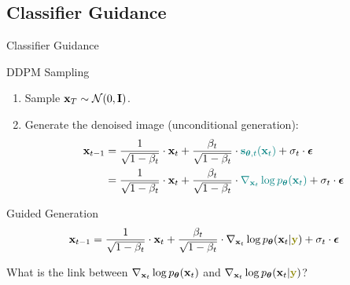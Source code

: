 \documentclass{beamer}
\renewcommand{\eqpause}{}
\renewcommand{\nextonslide}[1]{#1}
\begin{document}
\subsection{Classifier Guidance}
\begin{frame}{Classifier Guidance}
	\begin{block}{DDPM Sampling}
		\begin{enumerate}
			\item Sample $\mathbf{x}_T \sim \mathcal{N}(0, \mathbf{I})$.
			\item Generate the denoised image (unconditional generation):
			\vspace{-0.3cm}
			\begin{align*}
				\bx_{t - 1} &= \frac{1}{\sqrt{1 - \beta_t}} \cdot \bx_t + \frac{\beta_t}{\sqrt{1 - \beta_t}} \cdot {\color{teal}\bs_{\btheta, t} (\bx_t)} +  \sigma_t \cdot \bepsilon \\
				\nextonslide{
				& = \frac{1}{\sqrt{1 - \beta_t}} \cdot \bx_t + \frac{\beta_t}{\sqrt{1 - \beta_t}} \cdot {\color{teal} \nabla_{\bx_t} \log \pt(\bx_t)} +  \sigma_t \cdot \bepsilon
				}
			\end{align*}
			\vspace{-0.5cm}
		\end{enumerate}
	\end{block}
	\eqpause
	\begin{block}{Guided Generation}
		\vspace{-0.5cm}
		\[
			\bx_{t - 1} = \frac{1}{\sqrt{1 - \beta_t}}\cdot \bx_t +  \frac{\beta_t}{\sqrt{1 - \beta_t}}  \cdot  \nabla_{\bx_t} \log \pt(\bx_t | {\color{olive}\by}) +  \sigma_t \cdot \bepsilon
		\]
		\vspace{-0.3cm}
	\end{block}
	\eqpause
	What is the link between $\nabla_{\mathbf{x}_t} \log p_{\boldsymbol{\theta}}(\mathbf{x}_t)$ and $\nabla_{\bx_t} \log \pt(\bx_t | {\color{olive}\by})$?
\end{frame}
\end{document}
